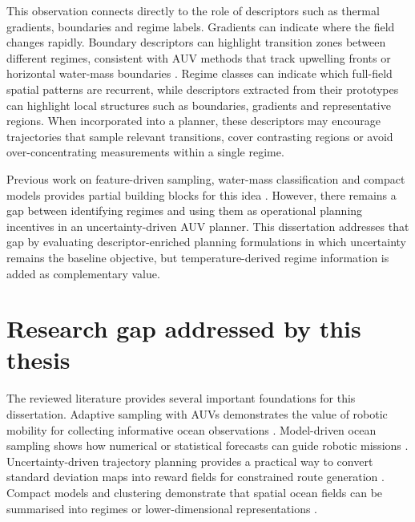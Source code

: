 This observation connects directly to the role of descriptors such as thermal gradients, boundaries and regime labels. Gradients can indicate where the field changes rapidly. Boundary descriptors can highlight transition zones between different regimes, consistent with AUV methods that track upwelling fronts or horizontal water-mass boundaries \parencite{zhang2016fourdimensional,cruz2014horizontalboundary}. Regime classes can indicate which full-field spatial patterns are recurrent, while descriptors extracted from their prototypes can highlight local structures such as boundaries, gradients and representative regions. When incorporated into a planner, these descriptors may encourage trajectories that sample relevant transitions, cover contrasting regions or avoid over-concentrating measurements within a single regime.

Previous work on feature-driven sampling, water-mass classification and compact models provides partial building blocks for this idea \parencite{das2012coordinated,fossum2020compact,ge2023watermasses}. However, there remains a gap between identifying regimes and using them as operational planning incentives in an uncertainty-driven AUV planner. This dissertation addresses that gap by evaluating descriptor-enriched planning formulations in which uncertainty remains the baseline objective, but temperature-derived regime information is added as complementary value.

\section{Research gap addressed by this thesis} \label{sec:rw_gap}

The reviewed literature provides several important foundations for this dissertation. Adaptive sampling with AUVs demonstrates the value of robotic mobility for collecting informative ocean observations \parencite{hwang2019auvreview,curtin2009aosn}. Model-driven ocean sampling shows how numerical or statistical forecasts can guide robotic missions \parencite{lermusiaux2007adaptive,mendes2025oceanmodeldriven}. Uncertainty-driven trajectory planning provides a practical way to convert standard deviation maps into reward fields for constrained route generation \parencite{bernacchi2025closingloop,duarte2025geostatistical}. Compact models and clustering demonstrate that spatial ocean fields can be summarised into regimes or lower-dimensional representations \parencite{fossum2020compact,ge2023watermasses}.

